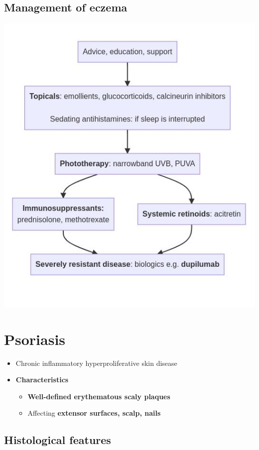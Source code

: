 \documentclass[
  12pt,
]{memoir}
\providecommand{\tightlist}{%
  \setlength{\itemsep}{0pt}\setlength{\parskip}{0pt}}
\begin{document}
\hypertarget{management-of-eczema}{%
\subsection{Management of eczema}\label{management-of-eczema}}

\includegraphics[width=.8\textwidth]{../assets/med/eczema.jpg}

\pagebreak

\hypertarget{psoriasis}{%
\section{Psoriasis}\label{psoriasis}}

\begin{itemize}
\tightlist
\item
  Chronic inflammatory hyperproliferative skin disease
\item
  \textbf{Characteristics}

  \begin{itemize}
  \tightlist
  \item
    \textbf{Well-defined erythematous scaly plaques}
  \item
    Affecting \textbf{extensor surfaces, scalp, nails}
  \end{itemize}
\end{itemize}

\hypertarget{histological-features}{%
\subsection{Histological features}\label{histological-features}}
\end{document}
